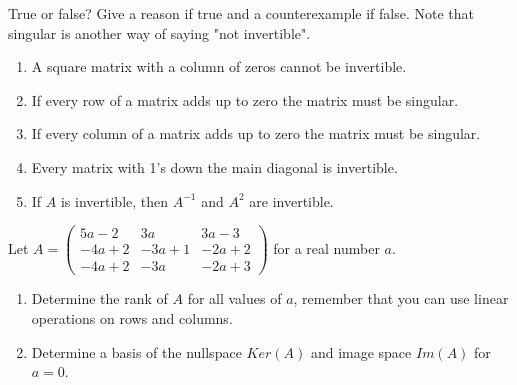 \documentclass[11pt,nocut]{article}
\begin{document}


\vspace{1cm}

\begin{problem}[2.5 points]
True or false? Give a reason if true and a counterexample if false. Note that singular is another way of saying "not invertible".
\begin{enumerate}[label=\normalfont(\textbf{\alph*})]
  \item A square matrix with a column of zeros cannot be invertible.
  \item If every row of a matrix adds up to zero the matrix must be singular.
  \item If every column of a matrix adds up to zero the matrix must be singular.
  \item Every matrix with 1's down the main diagonal is invertible.
  \item If $A$ is invertible, then $A^{-1}$ and $A^2$ are invertible.
\end{enumerate}
\end{problem}

\begin{problem}[2.5 points]
    Let $ A = \begin{pmatrix}
        5a - 2 & 3a & 3a-3 \\
        -4a + 2 & -3a + 1 & -2a + 2 \\
        -4a + 2 & -3a & -2a + 3
    \end{pmatrix}
    $ for a real number $a$.
    \begin{enumerate}[label=\normalfont(\textbf{\alph*})]
        \item Determine the rank of $A$ for all values of $a$, remember that you can use linear operations on rows and columns.
        \item Determine a basis of the nullspace $Ker(A)$ and image space $Im(A)$ for $a = 0$.
    \end{enumerate}
\end{problem}
\end{document}
